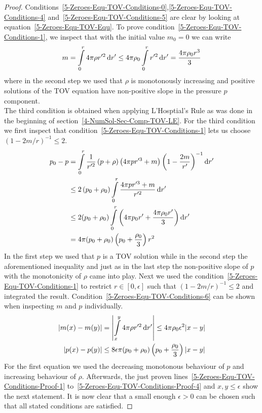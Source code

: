\begin{proof}
	Conditions~\eqref{5-Zeroes-Equ-TOV-Conditions-0},\eqref{5-Zeroes-Equ-TOV-Conditions-4} and~\eqref{5-Zeroes-Equ-TOV-Conditions-5} are clear by looking at equation~\eqref{5-Zeroes-Equ-TOV-Equ}.
	To prove condition~\eqref{5-Zeroes-Equ-TOV-Conditions-1}, we inspect that with the initial value $m_0=0$ we can write
	\begin{equation}
		m = \int\limits_0^r 4\pi\rho r'^2 \mathop{}\!\mathrm{d} r'\leq4\pi\rho_0\int\limits_0^r r'^2 \mathop{}\!\mathrm{d} r'=\frac{4\pi\rho_0 r^3}{3}
		\label{eq:5-Zeroes-TOv-Conditions-Proof-Intermed-1}
	\end{equation}
	where in the second step we used that $\rho$ is monotonously increasing and positive solutions of the \ac{TOV} equation have non-positive slope in the pressure $p$ component.\\
	The third condition is obtained when applying L'Hosptial's Rule as was done in the beginning of section~\ref{4-NumSol-Sec-Comp-TOV-LE}.
	For the third condition we first inspect that condition~\ref{5-Zeroes-Equ-TOV-Conditions-1} lets us choose $(1-2m/r)^{-1}\leq 2$.
	\begin{align}
		p_0 - p &=\int\limits_0^r\frac{1}{r'^2}\left(p+\rho\right)\left(4\pi pr'^3+m\right)\left(1-\frac{2m}{r'}\right)^{-1}\mathop{}\!\mathrm{d} r'\label{5-Zeroes-Equ-TOV-Conditions-Proof-1}\\
				&\leq2\left(p_0+\rho_0\right)\int\limits_0^r\frac{4\pi pr'^3+m}{r'^2}\mathop{}\!\mathrm{d} r'\label{5-Zeroes-Equ-TOV-Conditions-Proof-2}\\
				&\leq2(p_0+\rho_0)\int\limits_0^r\left(4\pi p_0 r' + \frac{4\pi\rho_0 r'}{3}\right)\mathop{}\!\mathrm{d} r'\label{5-Zeroes-Equ-TOV-Conditions-Proof-3}\\
				&=4\pi(p_0+\rho_0)\left(p_0+\frac{\rho_0}{3}\right)r^2\label{5-Zeroes-Equ-TOV-Conditions-Proof-4}
	\end{align}
	In the first step we used that $p$ is a \ac{TOV} solution while in the second step the aforementioned inequality and just as in the last step the non-positive slope of $p$ with the monotonicity of $\rho$ came into play.
	Next we used the condition~\ref{5-Zeroes-Equ-TOV-Conditions-1} to restrict $r\in[0,\epsilon]$ such that $(1-2m/r)^{-1}\leq2$ and integrated the result.
	Condition~\eqref{5-Zeroes-Equ-TOV-Conditions-6} can be shown when inspecting $m$ and $p$ individually.
	\begin{align}
		|m(x)-m(y)|&=\left|\int\limits_x^y 4\pi\rho r'^2 \mathop{}\!\mathrm{d} r'\right|\leq4\pi\rho_0\epsilon^2|x-y|\\
		|p(x)-p(y)|&\leq8\epsilon\pi(p_0+\rho_0)\left(p_0+\frac{\rho_0}{3}\right)|x-y|
	\end{align}
	For the first equation we used the decreasing monotonous behaviour of $p$ and increasing behaviour of $\rho$.
	Afterwards, the just proven lines~\eqref{5-Zeroes-Equ-TOV-Conditions-Proof-1} to~\eqref{5-Zeroes-Equ-TOV-Conditions-Proof-4} and $x,y\leq\epsilon$ show the next statement.
	It is now clear that a small enough $\epsilon>0$ can be chosen such that all stated conditions are satisfied.
\end{proof}\noindent
